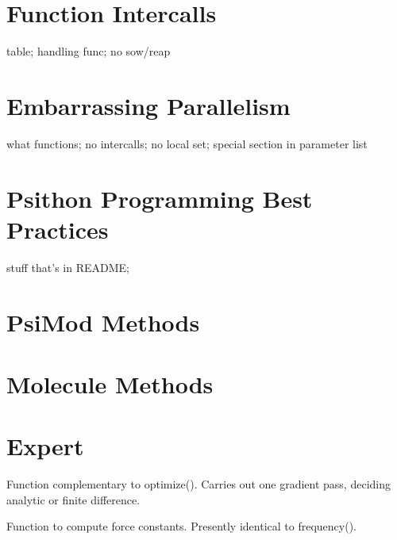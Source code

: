 \documentclass[letterpaper,10pt,english]{sphinxmanual}
\begin{document}
\chapter{Function Intercalls}
\label{index:sec-intercalls}\label{index:function-intercalls}
table; handling func; no sow/reap


\chapter{Embarrassing Parallelism}
\label{index:embarrassing-parallelism}
what functions; no intercalls; no local set; special section in parameter list


\chapter{Psithon Programming Best Practices}
\label{index:psithon-programming-best-practices}
stuff that's in README;


\chapter{PsiMod Methods}
\label{index:psimod-methods}

\chapter{Molecule Methods}
\label{index:molecule-methods}

\chapter{Expert}
\label{index:module-driver}\label{index:expert}

\begin{fulllineitems}
\label{index:driver.gradient}
Function complementary to optimize(). Carries out one gradient pass,
deciding analytic or finite difference.

\end{fulllineitems}


\begin{fulllineitems}
\label{index:driver.hessian}
Function to compute force constants. Presently identical to frequency().

\end{fulllineitems}
\end{document}
